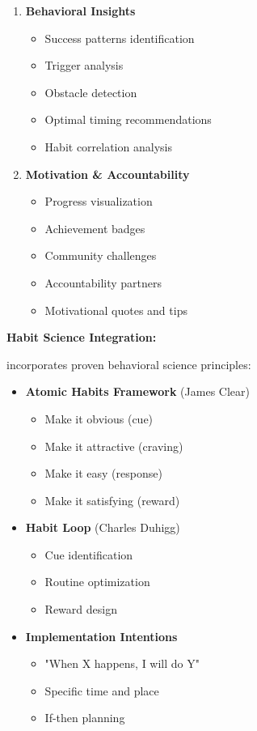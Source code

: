 \begin{enumerate}
    \item \textbf{Behavioral Insights}
    \begin{itemize}
        \item Success patterns identification
        \item Trigger analysis
        \item Obstacle detection
        \item Optimal timing recommendations
        \item Habit correlation analysis
    \end{itemize}
    
    \item \textbf{Motivation \& Accountability}
    \begin{itemize}
        \item Progress visualization
        \item Achievement badges
        \item Community challenges
        \item Accountability partners
        \item Motivational quotes and tips
    \end{itemize}
\end{enumerate}

\textbf{Habit Science Integration:}

\lifeos{} incorporates proven behavioral science principles:

\begin{itemize}
    \item \textbf{Atomic Habits Framework} (James Clear)
    \begin{itemize}
        \item Make it obvious (cue)
        \item Make it attractive (craving)
        \item Make it easy (response)
        \item Make it satisfying (reward)
    \end{itemize}
    
    \item \textbf{Habit Loop} (Charles Duhigg)
    \begin{itemize}
        \item Cue identification
        \item Routine optimization
        \item Reward design
    \end{itemize}
    
    \item \textbf{Implementation Intentions}
    \begin{itemize}
        \item "When X happens, I will do Y"
        \item Specific time and place
        \item If-then planning
    \end{itemize}
\end{itemize}

